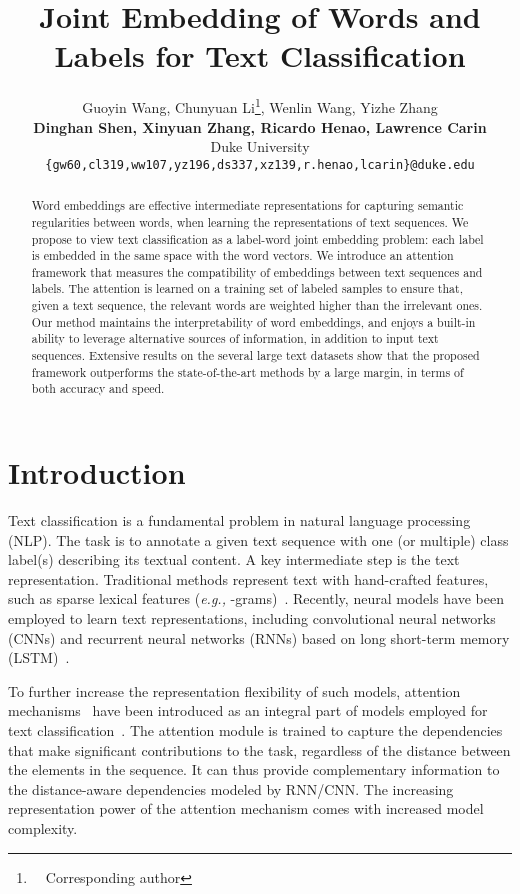 \documentclass[11pt,a4paper]{article}
\title{Joint Embedding of Words and Labels for Text Classification}
\author{Guoyin Wang, Chunyuan Li\thanks{~~Corresponding author}, Wenlin Wang, Yizhe Zhang\\ 
	 \textbf{Dinghan Shen, Xinyuan Zhang, Ricardo Henao, Lawrence Carin}  \\
  Duke University \\
  {\tt \{gw60,cl319,ww107,yz196,ds337,xz139,r.henao,lcarin\}@duke.edu} \\}
\date{}
\newcommand{\eg}[0]{\emph{e.g., }}
\begin{document}
\maketitle
\begin{abstract}
Word embeddings are effective intermediate representations for capturing semantic regularities between words, when learning the representations of text sequences. We propose to view text classification as a label-word joint embedding problem: each label is embedded in the same space with the word vectors. We introduce an attention framework that measures the compatibility of embeddings between text sequences and labels. The attention is learned on a training set of labeled samples to ensure that, given a text sequence, the relevant words are weighted higher than the irrelevant ones. Our method maintains the interpretability of word embeddings, and enjoys a built-in ability to leverage alternative sources of information, in addition to input text sequences.  Extensive results on the several large text datasets show that the proposed framework outperforms the state-of-the-art methods by a large margin, in terms of both accuracy and speed.

\end{abstract}

\section{Introduction}
Text classification is a fundamental problem in natural language processing (NLP). The task is to annotate a given text sequence with one (or multiple) class label(s) describing its textual content. 
A key intermediate step is the text representation. Traditional methods represent text with hand-crafted features, such as sparse lexical features (\eg -grams)~\cite{wang2012baselines}. Recently, neural models have been employed to learn text representations, including convolutional neural networks (CNNs) \cite{kalchbrenner2014convolutional,zhang2017deconvolutional,shen2017deconvolutional} and recurrent neural networks (RNNs) based on long short-term memory (LSTM)~\cite{hochreiter1997long,wang2018topic}.

To further increase the representation flexibility of such models, attention mechanisms~\cite{bahdanau2015neural} have been introduced as an integral part of models employed for text classification~\cite{yang2016hierarchical}. The attention module is trained to capture the dependencies that make significant contributions to the task, regardless of the distance between the elements in the sequence. It can thus provide complementary information to the distance-aware dependencies modeled by RNN/CNN. The increasing representation power of the attention mechanism comes with increased model complexity.
\end{document}
